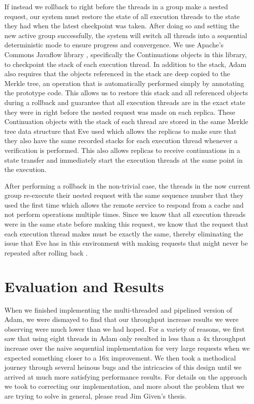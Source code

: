 \documentclass[11pt, oneside]{report}
\begin{document}
If instead we rollback to right before the threads in a group make a nested request, our system must restore the state of all execution threads to the state they had when the latest checkpoint was taken. After doing so and setting the new active group successfully, the system will switch all threads into a sequential deterministic mode to ensure progress and convergence.
We use Apache's Commons Javaflow library \cite{javaflow}, specifically the Continuations objects in this library, to checkpoint the stack of each execution thread.
In addition to the stack, Adam also requires that the objects referenced in the stack are deep copied to the Merkle tree, an operation that is automatically performed simply by annotating the prototype code.
This allows us to restore this stack and all referenced objects during a rollback and guarantee that all execution threads are in the exact state they were in right before the nested request was made on each replica.
These Continuation objects with the stack of each thread are stored in the same Merkle tree data structure that Eve used which allows the replicas to make sure that they also have the same recorded stacks for each execution thread whenever a verification is performed. 
This also allows replicas to receive continuations in a state transfer and immediately start the execution threads at the same point in the execution. 

After performing a rollback in the non-trivial case, the threads in the now current group re-execute their nested request with the same sequence number that they used the first time which allows the remote service to respond from a cache and not perform operations multiple times.
Since we know that all execution threads were in the same state before making this request, we know that the request that each execution thread makes must be exactly the same, thereby eliminating the issue that Eve has in this environment with making requests that might never be repeated after rolling back \cite{manosThesis}.

\chapter{Evaluation and Results}\label{AdamResults}

When we finished implementing the multi-threaded and pipelined version of Adam, we were dismayed to find that our throughput increase results we were observing were much lower than we had hoped. 
For a variety of reasons, we first saw that using eight threads in Adam only resulted in less than a 4x throughput increase over the naive sequential implementation for very large requests when we expected something closer to a 16x improvement. 
We then took a methodical journey through several heinous bugs and the intricacies of this design until we arrived at much more satisfying performance results. 
For details on the approach we took to correcting our implementation, and more about the problem that we are trying to solve in general, please read Jim Given's thesis.
\end{document}
